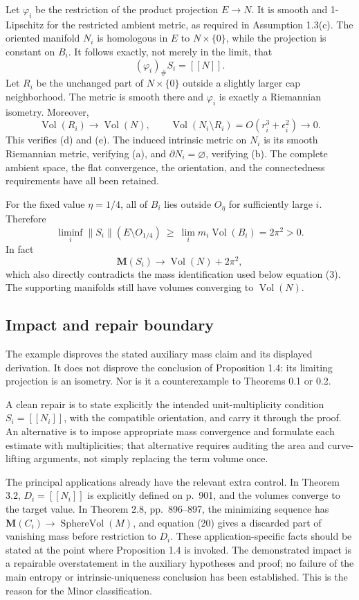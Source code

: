 \documentclass[10pt]{article}
\begin{document}
Let \(\varphi_i\) be the restriction of the product projection \(E\to N\). It is smooth and 1-Lipschitz for the restricted ambient metric, as required in Assumption 1.3(c). The oriented manifold \(N_i\) is homologous in \(E\) to \(N\times\{0\}\), while the projection is constant on \(B_i\). It follows exactly, not merely in the limit, that \[(\varphi_i)_\# S_i=[\![N]\!] .\] Let \(R_i\) be the unchanged part of \(N\times\{0\}\) outside a slightly larger cap neighborhood. The metric is smooth there and \(\varphi_i\) is exactly a Riemannian isometry. Moreover, \[\operatorname{Vol}(R_i)\longrightarrow\operatorname{Vol}(N),\qquad
 \operatorname{Vol}(N_i\setminus R_i)=O(r_i^3+\epsilon_i^2)\longrightarrow0.\] This verifies (d) and (e). The induced intrinsic metric on \(N_i\) is its smooth Riemannian metric, verifying (a), and \(\partial N_i=\varnothing\), verifying (b). The complete ambient space, the flat convergence, the orientation, and the connectedness requirements have all been retained.\par
For the fixed value \(\eta=1/4\), all of \(B_i\) lies outside \(O_\eta\) for sufficiently large \(i\). Therefore \[\liminf_i\|S_i\|(E\setminus O_{1/4})
 \ \geq\ \lim_i m_i\operatorname{Vol}(B_i)=2\pi^2>0 .\] In fact \[\mathbf M(S_i)\longrightarrow\operatorname{Vol}(N)+2\pi^2 ,\] which also directly contradicts the mass identification used below equation (3). The supporting manifolds still have volumes converging to \(\operatorname{Vol}(N)\).\par
\subsection*{Impact and repair boundary}
The example disproves the stated auxiliary mass claim and its displayed derivation. It does not disprove the conclusion of Proposition 1.4: its limiting projection is an isometry. Nor is it a counterexample to Theorems 0.1 or 0.2.\par
A clean repair is to state explicitly the intended unit-multiplicity condition \(S_i=[\![N_i]\!]\), with the compatible orientation, and carry it through the proof. An alternative is to impose appropriate mass convergence and formulate each estimate with multiplicities; that alternative requires auditing the area and curve-lifting arguments, not simply replacing the term volume once.\par
The principal applications already have the relevant extra control. In Theorem 3.2, \(D_i=[\![N_i]\!]\) is explicitly defined on p. 901, and the volumes converge to the target value. In Theorem 2.8, pp. 896–897, the minimizing sequence has \(\mathbf M(C_i)\to\operatorname{SphereVol}(M)\), and equation (20) gives a discarded part of vanishing mass before restriction to \(D_i\). These application-specific facts should be stated at the point where Proposition 1.4 is invoked. The demonstrated impact is a repairable overstatement in the auxiliary hypotheses and proof; no failure of the main entropy or intrinsic-uniqueness conclusion has been established. This is the reason for the Minor classification.\par
\end{document}

